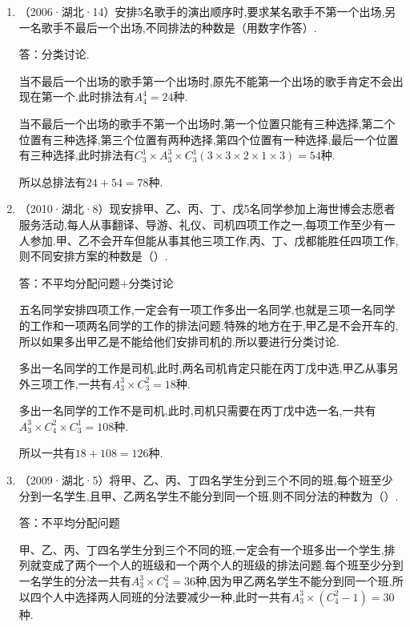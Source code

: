 \begin{liti}
    \begin{enumerate}[label=\protect\enumlabel{\thetcbcounter\arabic*}, leftmargin=0mm]
    \item （2006·湖北·14）安排5名歌手的演出顺序时,要求某名歌手不第一个出场,另一名歌手不最后一个出场,不同排法的种数是（用数字作答）.
    
    答：分类讨论.

    当不最后一个出场的歌手第一个出场时,原先不能第一个出场的歌手肯定不会出现在第一个.此时排法有$A_4^4=24$种.

    当不最后一个出场的歌手不第一个出场时,第一个位置只能有三种选择,第二个位置有三种选择,第三个位置有两种选择,第四个位置有一种选择,最后一个位置有三种选择,此时排法有$C_3^1\times A_3^3 \times C_3^1(3\times 3\times 2\times 1\times 3)=54$种.

    所以总排法有$24+54=78$种.

    \item （2010·湖北·8）现安排甲、乙、丙、丁、戊5名同学参加上海世博会志愿者服务活动,每人从事翻译、导游、礼仪、司机四项工作之一,每项工作至少有一人参加.甲、乙不会开车但能从事其他三项工作,丙、丁、戊都能胜任四项工作,则不同安排方案的种数是（\quad）.
    
    答：不平均分配问题$+$分类讨论
    
    五名同学安排四项工作,一定会有一项工作多出一名同学,也就是三项一名同学的工作和一项两名同学的工作的排法问题.特殊的地方在于,甲乙是不会开车的,所以如果多出甲乙是不能给他们安排司机的.所以要进行分类讨论.

    多出一名同学的工作是司机,此时,两名司机肯定只能在丙丁戊中选,甲乙从事另外三项工作,一共有$A_3^3\times C_3^2=18$种.

    多出一名同学的工作不是司机,此时,司机只需要在丙丁戊中选一名,一共有$A_3^3\times C_4^2\times C_3^1=108$种.

    所以一共有$18+108=126$种.

    \item （2009·湖北·5）将甲、乙、丙、丁四名学生分到三个不同的班,每个班至少分到一名学生,且甲、乙两名学生不能分到同一个班,则不同分法的种数为（\quad）.
    
    答：不平均分配问题

    甲、乙、丙、丁四名学生分到三个不同的班,一定会有一个班多出一个学生,排列就变成了两个一个人的班级和一个两个人的班级的排法问题.每个班至少分到一名学生的分法一共有$A_3^3\times C_4^2=36$种,因为甲乙两名学生不能分到同一个班,所以四个人中选择两人同班的分法要减少一种,此时一共有$A_3^3\times (C_4^2-1)=30$种.
    \end{enumerate}
\end{liti}

